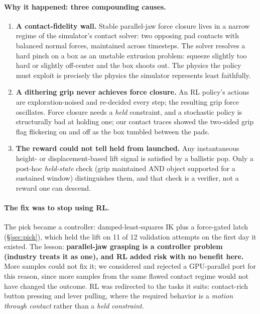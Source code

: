 \documentclass[11pt]{article}
\begin{document}
\paragraph{Why it happened: three compounding causes.}
\begin{enumerate}[nosep]
  \item \textbf{A contact-fidelity wall.} Stable parallel-jaw force closure lives in a narrow regime of the simulator's contact solver: two opposing pad contacts with balanced normal forces, maintained across timesteps. The solver resolves a hard pinch on a box as an unstable extrusion problem: squeeze slightly too hard or slightly off-center and the box shoots out. The physics the policy must exploit is precisely the physics the simulator represents least faithfully.
  \item \textbf{A dithering grip never achieves force closure.} An RL policy's actions are exploration-noised and re-decided every step; the resulting grip force oscillates. Force closure needs a \emph{held} constraint, and a stochastic policy is structurally bad at holding one; our contact traces showed the two-sided grip flag flickering on and off as the box tumbled between the pads.
  \item \textbf{The reward could not tell held from launched.} Any instantaneous height- or displacement-based lift signal is satisfied by a ballistic pop. Only a post-hoc \emph{held-state} check (grip maintained AND object supported for a sustained window) distinguishes them, and that check is a verifier, not a reward one can descend.
\end{enumerate}

\paragraph{The fix was to stop using RL.} The pick became a controller: damped-least-squares IK plus a force-gated latch (\S\ref{sec:pick}), which held the lift on 11 of 12 validation attempts on the first day it existed. The lesson: \textbf{parallel-jaw grasping is a controller problem (industry treats it as one), and RL added risk with no benefit here.} More samples could not fix it; we considered and rejected a GPU-parallel port for this reason, since more samples from the same flawed contact regime would not have changed the outcome. RL was redirected to the tasks it suits: contact-rich button pressing and lever pulling, where the required behavior is a \emph{motion through contact} rather than a \emph{held constraint}.
\end{document}

